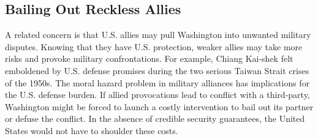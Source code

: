 

\subsection*{Bailing Out Reckless Allies}

A related concern is that U.S. allies may pull Washington into unwanted military disputes. Knowing that they have U.S. protection, weaker allies may take more risks and provoke military confrontations. %
For example, Chiang Kai-shek felt emboldened by U.S. defense promises during the two serious Taiwan Strait crises of the 1950s.\autocite{Benson2012} The moral hazard problem in military alliances has implications for the U.S. defense burden. If allied provocations lead to conflict with a third-party, Washington might be forced to launch a costly intervention to bail out its partner or defuse the conflict.\autocite[See][44]{Posen2014} In the absence of credible security guarantees, the United States would not have to shoulder these costs.



